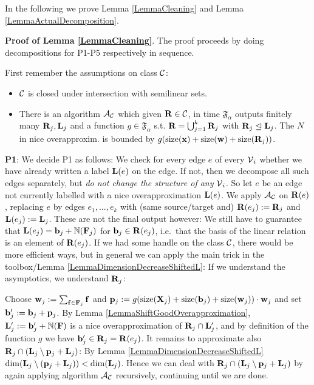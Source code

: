 In the following we prove Lemma \ref{LemmaCleaning} and Lemma \ref{LemmaActualDecomposition}.

\textbf{Proof of Lemma \ref{LemmaCleaning}}. The proof proceeds by doing decompositions for P1-P5 respectively in sequence. 

First remember the assumptions on class \(\mathcal{C}\):

\begin{itemize}
\item \(\mathcal{C}\) is closed under intersection with semilinear sets.
\item There is an algorithm \(\mathcal{A}_{\mathcal{C}}\) which given \(\mathbf{R} \in \mathcal{C}\), in time \(\mathfrak{F}_{\alpha}\) outputs finitely many \(\mathbf{R}_j, \mathbf{L}_j\) and a function \(g \in \mathfrak{F}_{\alpha}\) s.t. \(\mathbf{R}=\bigcup_{j=1}^k \mathbf{R}_j\) with \(\mathbf{R}_j \trianglelefteq \mathbf{L}_j\). The \(N\) in nice overapproxim. is bounded by \(g(\operatorname{size}(\mathbf{x})+\operatorname{size}(\mathbf{w})+\operatorname{size}(\mathbf{R}_j))\).
\end{itemize}

\textbf{P1}: We decide P1 as follows: We check for every edge \(e\) of every \(\operatorname{\mathcal{V}}_i\) whether we have already written a label \(\mathbf{L}(e)\) on the edge. If not, then we decompose all such edges separately, but \emph{do not change the structure of any} \(\operatorname{\mathcal{V}}_i\). So let \(e\) be an edge not currently labelled with a nice overapproximation \(\mathbf{L}(e)\). We apply \(\mathcal{A}_{\mathcal{C}}\) on \(\mathbf{R}(e)\), replacing \(e\) by edges \(e_1, \dots, e_k\) with (same source/target and) \(\mathbf{R}(e_j):=\mathbf{R}_j\) and \(\mathbf{L}(e_j):=\mathbf{L}_j\). These are not the final output however: We still have to guarantee that \(\mathbf{L}(e_j)=\mathbf{b}_j+\mathbb{N}(\mathbf{F}_j)\) for \(\mathbf{b}_j \in \mathbf{R}(e_j)\), i.e.\ that the basis of the linear relation is an element of \(\mathbf{R}(e_j)\). If we had some handle on the class \(\mathcal{C}\), there would be more efficient ways, but in general we can apply the main trick in the toolbox/Lemma \ref{LemmaDimensionDecreaseShiftedL}: If we understand the asymptotics, we understand \(\mathbf{R}_j\): 

Choose \(\mathbf{w}_j:=\sum_{\mathbf{f} \in \mathbf{F}_j} \mathbf{f}\) and \(\mathbf{p}_j:=g(\operatorname{size}(\mathbf{X}_j)+\operatorname{size}(\mathbf{b}_j)+\operatorname{size}(\mathbf{w}_j)) \cdot \mathbf{w}_j\) and set \(\mathbf{b}_j':=\mathbf{b}_j+\mathbf{p}_j\). By Lemma \ref{LemmaShiftGoodOverapproximation}, \(\mathbf{L}_j':=\mathbf{b}_j'+\mathbb{N}(\mathbf{F})\) is a nice overapproximation of \(\mathbf{R}_j \cap \mathbf{L}_j'\), and by definition of the function \(g\) we have \(\mathbf{b}_j' \in \mathbf{R}_j=\mathbf{R}(e_j)\). It remains to approximate also \(\mathbf{R}_j \cap (\mathbf{L}_j \setminus \mathbf{p}_j+\mathbf{L}_j)\): By Lemma \ref{LemmaDimensionDecreaseShiftedL} \(\dim(\mathbf{L}_j \setminus (\mathbf{p}_j+\mathbf{L}_j))< \dim(\mathbf{L}_j)\). Hence we can deal with \(\mathbf{R}_j \cap (\mathbf{L}_j \setminus \mathbf{p}_j+\mathbf{L}_j)\) by again applying algorithm \(\mathcal{A}_{\mathcal{C}}\) recursively, continuing until we are done. 

